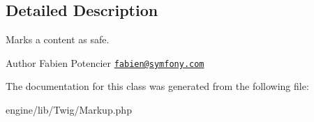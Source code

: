 \subsection{Detailed Description}
Marks a content as safe.

\begin{DoxyAuthor}{Author}
Fabien Potencier \href{mailto:fabien@symfony.com}{\tt fabien@symfony.\+com} 
\end{DoxyAuthor}


The documentation for this class was generated from the following file\+:\begin{DoxyCompactItemize}
\item 
engine/lib/\+Twig/Markup.\+php\end{DoxyCompactItemize}

